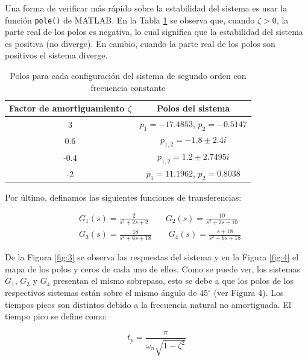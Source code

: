 Una forma de verificar más rápido sobre la estabilidad del sistema es usar la función \texttt{pole()} de MATLAB. En la Tabla \ref{tab:1} se observa que, cuando $\zeta > 0$, la parte real de los polos es negativa, lo cual significa que la estabilidad del sistema es positiva (no diverge). En cambio, cuando la parte real de los polos son positivos el sistema diverge.

\begin{table}[ht!]
    \centering
    \begin{tabular}{|c|c|}
        \hline
        Factor de amortiguamiento $\zeta$ & Polos del sistema\\
        \hline
        3 & $p_1 = -17.4853$, $p_2 = -0.5147$\\
        \hline
        0.6 & $p_{1,2} = -1.8 \pm 2.4i$\\
        \hline
        -0.4 & $p_{1,2} = 1.2 \pm 2.7495i$\\
        \hline
        -2 & $p_1 = 11.1962$, $p_2 = 0.8038$\\
        \hline
    \end{tabular}
    \caption{Polos para cada configuración del sistema de segundo orden con frecuencia constante}
    \label{tab:1}
\end{table}

\newpage

Por último, definamos las siguientes funciones de transferencias:

\begin{align}
    &G_1(s) = \frac{2}{s^2 + 2s + 2} \qquad G_2(s) = \frac{10}{s^2 + 2s + 10}\\
    &G_3(s) = \frac{18}{s^2 + 6s + 18} \qquad G_4(s) = \frac{s+ 18}{s^2 + 6s + 18}
\end{align}


\noindent De la Figura \ref{fig:3} se observa las respuestas del sistema y en la Figura \ref{fig:4} el mapa de los polos y ceros de cada uno de ellos. Como se puede ver, los sistemas $G_1$, $G_3$ y $G_4$ presentan el mismo sobrepaso, esto se debe a que los polos de los respectivos sistemas están sobre el mismo ángulo de $45^{\circ}$ (ver Figura 4).  Los tiempos picos son distintos debido a la frecuencia natural no amortiguada. El tiempo pico se define como:

\begin{equation}
    t_p = \frac{\pi}{\omega_n\sqrt{1 - \zeta^2}}
\end{equation}



